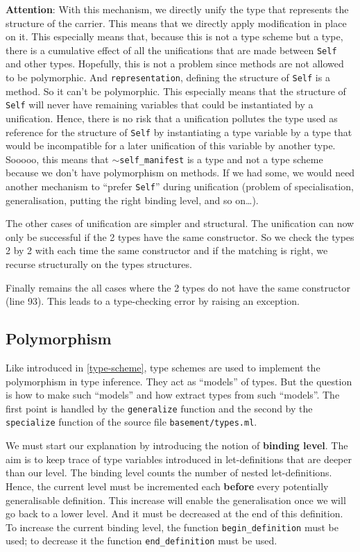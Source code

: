 {\bf Attention}: With this mechanism, we directly unify the type that
represents the structure of the carrier. This means that we directly
apply modification in place on it. This especially means that, because
this is not a type scheme but a type, there is a cumulative effect of
all the unifications that are made between {\tt Self} and other
types. Hopefully, this is not a problem since methods are not allowed
to be polymorphic. And {\tt representation}, defining the structure
of {\tt Self} is a method. So it can't be polymorphic. This especially
means that the structure of {\tt Self} will never have remaining
variables that could be instantiated by a unification. Hence, there is
no risk that a unification pollutes the type used as reference for the
structure of {\tt Self} by instantiating a type variable by a type
that would be incompatible for a later unification of this variable by
another type. Sooooo, this means that {\tt $\sim$self\_manifest} is a type
and not a type scheme because we don't have polymorphism on
methods. If we had some, we would need another mechanism to ``prefer
{\tt Self}'' during unification (problem of specialisation,
generalisation, putting the right binding level, and so on\ldots).


\medskip
The other cases of unification are simpler and structural. The
unification can now only be successful if the 2 types have the same
constructor. So we check the types 2 by 2 with each time the same
constructor and if the matching is right, we recurse structurally on
the types structures.

\medskip
Finally remains the all cases where the 2 types do not have the same
constructor (line 93). This leads to a type-checking error by raising
an exception.

\subsection{Polymorphism}
Like introduced in \ref{type-scheme}, type schemes are used to
implement the polymorphism in type inference. They act as ``models''
of types. But the question is how to make such ``models'' and how
extract types from such ``models''. The first point is handled by the
{\tt generalize} function and the second by the {\tt specialize}
function of the source file {\tt basement/types.ml}.

We must start our explanation by introducing the notion of
{\bf binding level}. The aim is to keep trace of type variables
introduced in let-definitions that are deeper than our level. The
binding level counts the number of nested let-definitions. Hence, the
current level must be incremented each {\bf before} every potentially
generalisable definition. This increase will enable the generalisation
once we will go back to a lower level. And it must be decreased at the
end of this definition. To increase the current binding level, the
function {\tt begin\_definition} must be used; to decrease it the
function {\tt end\_definition} must be used.


